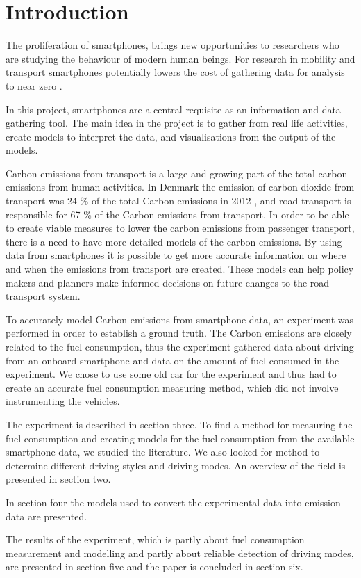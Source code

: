 \section{Introduction}

The proliferation of smartphones, brings new opportunities to researchers who are studying the behaviour of modern human beings. For research in mobility and transport smartphones potentially lowers the cost of gathering data for analysis to near zero \cite{Liu2013}.

In this project, smartphones are a central requisite as an information and data gathering tool. The main idea in the project is to gather from real life activities, create models to interpret the data, and visualisations from the output of the models. 

Carbon emissions from transport is a large and growing part of the total carbon emissions from human activities. In Denmark the emission of carbon dioxide from transport was 24 \% of the total Carbon emissions in 2012 \cite{nielsen2014}, and road transport is responsible for 67 \% of the Carbon emissions from transport. In order to be able to create viable measures to lower the carbon emissions from passenger transport, there is a need to have more detailed models of the carbon emissions. By using data from smartphones it is possible to get more accurate information on where and when the emissions from transport are created. These models can help policy makers and planners make informed decisions on future changes to the road transport system.

To accurately model Carbon emissions from smartphone data, an experiment was performed in order to establish a ground truth. The Carbon emissions are closely related to the fuel consumption, thus the experiment gathered data about driving from an onboard smartphone and data on the amount of fuel consumed in the experiment. We chose to use some old car for the experiment and thus had to create an accurate fuel consumption measuring method, which did not involve instrumenting the vehicles. 

The experiment is described  in section three. To find a method for measuring the fuel consumption and creating models for the fuel consumption from the available smartphone data, we studied the literature. We also looked for method to determine different driving styles and driving modes. An overview of the field is presented in section two.

In section four the models used to convert the experimental data into emission data are presented. 

The results of the experiment, which is partly about fuel consumption measurement and modelling and partly about reliable detection of driving modes, are presented in section five and the paper is concluded in section six.